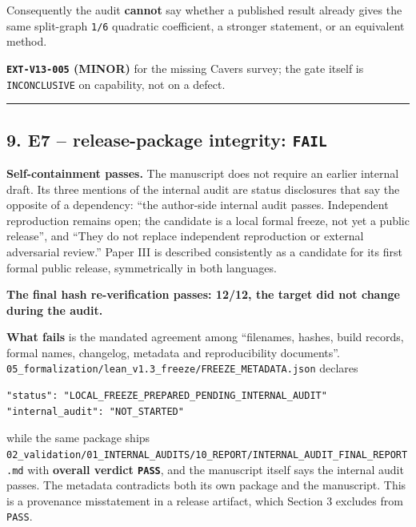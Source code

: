 \documentclass[
  10pt,
]{article}
\begin{document}
Consequently the audit \textbf{cannot} say whether a published result
already gives the same split-graph \texttt{1/6} quadratic coefficient, a
stronger statement, or an equivalent method.

\textbf{\texttt{EXT-V13-005} (MINOR)} for the missing Cavers survey; the
gate itself is \texttt{INCONCLUSIVE} on capability, not on a defect.

\begin{center}\rule{0.5\linewidth}{0.5pt}\end{center}

\subsection{\texorpdfstring{9. E7 -- release-package integrity:
\texttt{FAIL}}{9. E7 -- release-package integrity: FAIL}}\label{e7-release-package-integrity-fail}

\textbf{Self-containment passes.} The manuscript does not require an
earlier internal draft. Its three mentions of the internal audit are
status disclosures that say the opposite of a dependency: ``the
author-side internal audit passes. Independent reproduction remains
open; the candidate is a local formal freeze, not yet a public
release'', and ``They do not replace independent reproduction or
external adversarial review.'' Paper III is described consistently as a
candidate for its first formal public release, symmetrically in both
languages.

\textbf{The final hash re-verification passes: 12/12, the target did not
change during the audit.}

\textbf{What fails} is the mandated agreement among ``filenames, hashes,
build records, formal names, changelog, metadata and reproducibility
documents''.
\texttt{05\_formalization/lean\_v1.3\_freeze/FREEZE\_METADATA.json}
declares

\begin{verbatim}
"status": "LOCAL_FREEZE_PREPARED_PENDING_INTERNAL_AUDIT"
"internal_audit": "NOT_STARTED"
\end{verbatim}

while the same package ships
\texttt{02\_validation/01\_INTERNAL\_AUDITS/10\_REPORT/INTERNAL\_AUDIT\_FINAL\_REPORT.md}
with \textbf{overall verdict \texttt{PASS}}, and the manuscript itself
says the internal audit passes. The metadata contradicts both its own
package and the manuscript. This is a provenance misstatement in a
release artifact, which Section 3 excludes from \texttt{PASS}.
\end{document}
